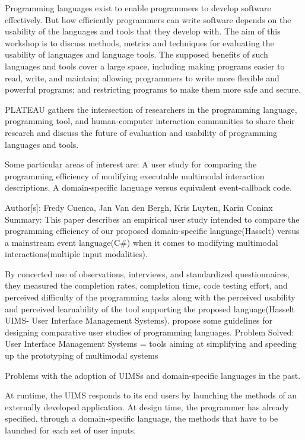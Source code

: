 Programming languages exist to enable programmers to develop software effectively. But how efficiently programmers can write software depends on the usability of the languages and tools that they develop with. The aim of this workshop is to discuss methods, metrics and techniques for evaluating the usability of languages and language tools. The supposed benefits of such languages and tools cover a large space, including making programs easier to read, write, and maintain; allowing programmers to write more flexible and powerful programs; and restricting programs to make them more safe and secure.

PLATEAU gathers the intersection of researchers in the programming language, programming tool, and human-computer interaction communities to share their research and discuss the future of evaluation and usability of programming languages and tools.

Some particular areas of interest are:
A user study for comparing the programming efficiency of modifying executable multimodal interaction descriptions. A domain-specific language versus equivalent event-callback code.



Author[s]: Fredy Cuenca, Jan Van den Bergh, Kris Luyten, Karin Coninx
Summary: This paper describes an empirical user study intended to compare the programming efficiency of our proposed domain-specific language(Hasselt) versus a mainstream event language(C\#) when it comes to modifying multimodal interactions(multiple input modalities).

 By concerted use of observations, interviews, and standardized questionnaires, they measured the completion rates, completion time, code testing effort, and perceived difficulty of the programming tasks along with the perceived usability and perceived learnability of the tool supporting the proposed language(Hasselt UIMS- User Interface Management Systems). propose some guidelines for designing comparative user studies of programming languages.
Problem Solved: 
User Interface Management Systems = tools aiming at simplifying and speeding up the prototyping of multimodal systems
				
			
Problems with the adoption of UIMSs and domain-specific languages in the past.  		 	 	 		
		
					
At runtime, the UIMS responds to its end users by launching the methods of an externally developed application. At design time, the programmer has already specified, through a domain-specific language, the methods that have to be launched for each set of user inputs.
				
